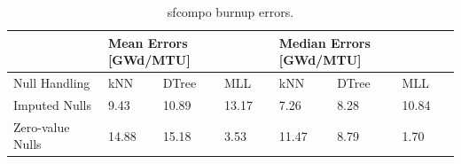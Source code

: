 \begin{table}[!ht]
  \centering
  \begin{tabular}{@{}l|lll|lll@{}}
  \toprule
                   & \multicolumn{3}{l|}{Mean Errors [GWd/MTU]} & \multicolumn{3}{l}{Median Errors [GWd/MTU]} \\ \toprule
  Null Handling    & kNN           & DTree         & MLL           & kNN            & DTree          & MLL    \\ \midrule
  Imputed Nulls    & 9.43          & 10.89         & 13.17         & 7.26           & 8.28           & 10.84  \\
  Zero-value Nulls & 14.88         & 15.18         & 3.53          & 11.47          & 8.79           & 1.70   \\ \bottomrule
  \end{tabular}
  \caption{sfcompo burnup errors.}
  \label{tbl:sfcoburn}
\end{table}

